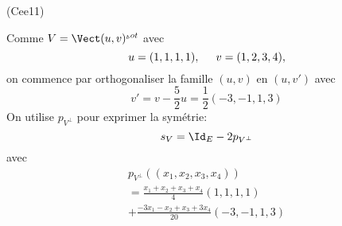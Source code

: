 \begin{tiny}(Cee11)\end{tiny} Comme $V =\Vect(u,v)^{_bot}$ avec 
\begin{displaymath}
 u = (1,1,1,1), \hspace{0.5cm}
v= (1,2,3,4),  
\end{displaymath}
on commence par orthogonaliser la famille $(u,v)$ en $(u,v')$ avec 
\begin{displaymath}
 v' = v - \frac{5}{2}u = \frac{1}{2}(-3,-1,1,3)
\end{displaymath}
On utilise $p_{V^{\bot}}$ pour exprimer la symétrie:
\begin{displaymath}
 s_V = \Id_E -2p_{V^\bot}
\end{displaymath}
avec
\begin{multline*}
p_{V^\bot}((x_1,x_2,x_3,x_4)) \\
=
\frac{x_1+x_2+x_3+x_4}{4}(1,1,1,1) \\
+
\frac{-3x_1-x_2+x_3+3x_4}{20}(-3,-1,1,3)
\end{multline*}
